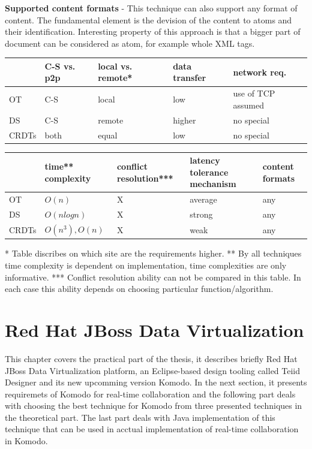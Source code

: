 \documentclass[12pt,oneside]{fithesis2}
\begin{document}
\vspace{3mm} 

\textbf{Supported content formats} - This technique can also support any format of content. The fundamental element is the devision of the content to atoms and their identification. Interesting property of this approach is that a bigger part of document can be considered as atom, for example whole XML tags.

\vspace{13mm} 
\newpage
\noindent
\begin{tabular}{| p{1.7cm} | p{2.2cm} | p{2.2cm} | p{2.2cm} | p{2.2cm} |}
\hline
 & C-S vs. p2p & local vs. remote* & data \newline transfer & network req.  \\
\hline
OT & C-S & local & low & use of TCP assumed \\
\hline
DS & C-S & remote & higher & no special \\
\hline
CRDTs & both & equal & low & no special \\
\hline
\end{tabular}
\newline
\vspace*{1 cm}
\newline
\begin{tabular}{| p{1.7cm} | p{2.2cm} | p{2.2cm} | p{2.2cm} | p{2.2cm} |}
\hline
 & time** \newline complexity & conflict resolution*** & latency tolerance  mechanism & content formats \\
\hline
OT &  \(O(n)\) & X & average  & any \\
\hline
DS & \(O(nlogn)\) & X & strong  & any \\
\hline
CRDTs & \(O(n^3), O(n)\) & X & weak  & any \\
\hline
\end{tabular}
\vspace{10mm}
\newline
* Table discribes on which site are the requirements higher. \newline
** By all techniques time complexity is dependent on implementation, time complexities are only informative. \newline
*** Conflict resolution ability can not be compared in this table. In each case this ability depends on choosing particular function/algorithm.
\chapter{Red Hat JBoss Data Virtualization}
\par This chapter covers the practical part of the thesis, it describes briefly Red Hat JBoss Data Virtualization platform, an Eclipse-based design tooling called Teiid Designer and its new upcomming version Komodo. In the next section, it presents requiremets of Komodo for real-time collaboration and the following part deals with choosing the best technique for Komodo from three presented techniques in the theoretical part. The last part deals with Java implementation of this technique that can be used in acctual implementation of real-time collaboration in Komodo.
\end{document}
